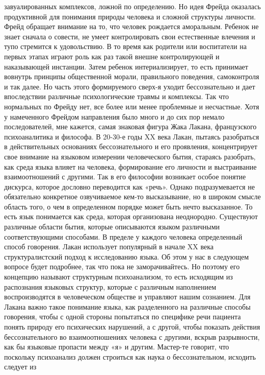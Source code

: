 завуалированных комплексов, ложной по определению. Но идея Фрейда оказалась
продуктивной для понимания природы человека и сложной структуры личности. Фрейд
обращает внимание на то, что человек рождается аморальным. Ребенок не знает
сначала о совести, не умеет контролировать свои естественные влечения и тупо
стремится к удовольствию. В то время как родители или воспитатели на первых
этапах играют роль как раз такой внешне контролирующей и наказывающей инстанции.
Затем ребенок интериализирует, то есть принимает вовнутрь принципы общественной
морали, правильного поведения, самоконтроля и так далее. Но часть этого
формируемого сверх-я уходит бессознательно и дает впоследствии различные
психологические травмы и комплексы. Так что нормальных по Фрейду нет, все более
или менее проблемные и несчастные. Хотя у намеченного Фрейдом направления было
много и до сих пор немало последователей, мне кажется, самая знаковая фигура
Жака Лакана, французского психоаналитика и философа. В 20-30-е годы XX века
Лакан, пытаясь разобраться в действительных основаниях бессознательного и его
проявления, концентрирует свое внимание на языковом измерении человеческого
бытия, стараясь разобрать, как среда языка влияет на человека, формирование его
личности и выстраивание взаимоотношений с другими. Так в его философии возникает
особое понятие дискурса, которое дословно переводится как «речь». Однако
подразумевается не обязательно конкретное озвучиваемое кем-то высказывание, но в
широком смысле область того, о чем в определенном порядке может быть нечто
высказанное. То есть язык понимается как среда, которая организована
неоднородно. Существуют различные области бытия, которые описываются языком
различными соответствующими способами. В пределе у каждого человека определенный
способ говорения. Лакан использует популярный в начале XX века структуралистский
подход к исследованию языка. Об этом у нас в следующем вопросе будет подробнее,
так что пока не заморачивайтесь. Но поэтому его концепцию называют структурным
психоанализом, то есть исходящим из распознания языковых структур, которые с
различным наполнением воспроизводятся в человеческом обществе и управляют нашим
сознанием. Для Лакана важно такое понимание языка, как разделенного на различные
способы говорения, чтобы с одной стороны попытаться по специфике речи пациента
понять природу его психических нарушений, а с другой, чтобы показать действия
бессознательного во взаимоотношениях человека с другими, вскрыв разрывности, как
бы языковые пропасти между «я» и другим. Мастер-те говорит, что поскольку
психоанализ должен строиться как наука о бессознательном, исходить следует из
